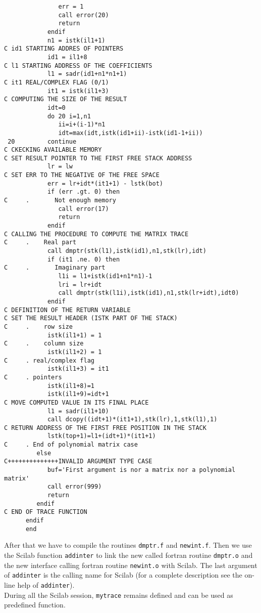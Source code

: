 \begin{verbatim}
               err = 1
               call error(20)
               return
            endif
            n1 = istk(il1+1)
C id1 STARTING ADDRES OF POINTERS
            id1 = il1+8
C l1 STARTING ADDRESS OF THE COEFFICIENTS
            l1 = sadr(id1+n1*n1+1)
C it1 REAL/COMPLEX FLAG (0/1)
            it1 = istk(il1+3)
C COMPUTING THE SIZE OF THE RESULT     
            idt=0
            do 20 i=1,n1
               ii=i+(i-1)*n1
               idt=max(idt,istk(id1+ii)-istk(id1-1+ii))
 20         continue
C CKECKING AVAILABLE MEMORY
C SET RESULT POINTER TO THE FIRST FREE STACK ADDRESS
            lr = lw
C SET ERR TO THE NEGATIVE OF THE FREE SPACE
            err = lr+idt*(it1+1) - lstk(bot)
            if (err .gt. 0) then
C     .       Not enough memory
               call error(17)
               return
            endif     
C CALLING THE PROCEDURE TO COMPUTE THE MATRIX TRACE
C     .    Real part
            call dmptr(stk(l1),istk(id1),n1,stk(lr),idt)
            if (it1 .ne. 0) then
C     .       Imaginary part
               l1i = l1+istk(id1+n1*n1)-1
               lri = lr+idt
               call dmptr(stk(l1i),istk(id1),n1,stk(lr+idt),idt0)
            endif
C DEFINITION OF THE RETURN VARIABLE     
C SET THE RESULT HEADER (ISTK PART OF THE STACK)     
C     .    row size
            istk(il1+1) = 1
C     .    column size
            istk(il1+2) = 1
C     . real/complex flag
            istk(il1+3) = it1
C     . pointers
            istk(il1+8)=1
            istk(il1+9)=idt+1
C MOVE COMPUTED VALUE IN ITS FINAL PLACE     
            l1 = sadr(il1+10)
            call dcopy((idt+1)*(it1+1),stk(lr),1,stk(l1),1)
C RETURN ADDRESS OF THE FIRST FREE POSITION IN THE STACK     
            lstk(top+1)=l1+(idt+1)*(it1+1)
C     . End of polynomial matrix case
         else
C++++++++++++++INVALID ARGUMENT TYPE CASE
            buf='First argument is nor a matrix nor a polynomial matrix'
            call error(999)
            return
         endif
C END OF TRACE FUNCTION
      endif
      end

\end{verbatim}

After that we have to compile the routines {\tt dmptr.f} and {\tt newint.f}.
Then we use the Scilab function {\tt addinter} to link the new called fortran 
routine {\tt dmptr.o} and the new interface calling fortran routine 
{\tt newint.o} with Scilab. The last argument of {\tt addinter} is the
calling name for Scilab (for a complete description see the on-line help 
of {\tt addinter}). \\
During all the Scilab session, {\tt mytrace} remains defined and can be
used as predefined function. 

